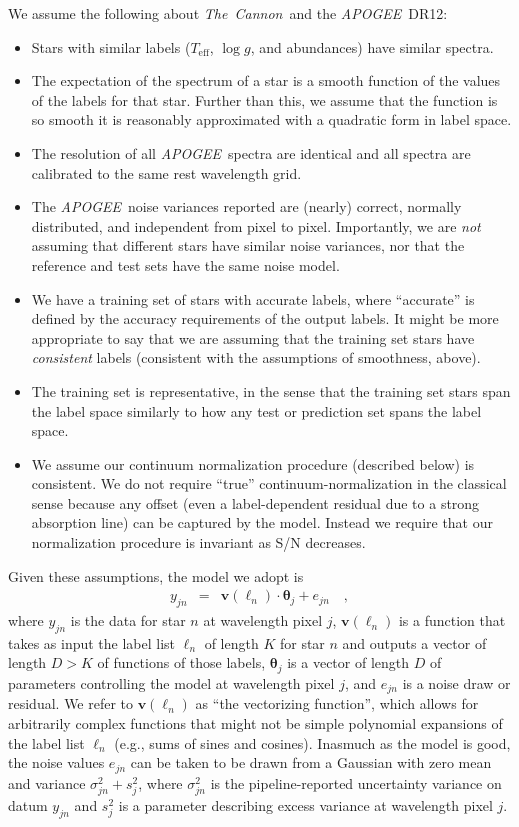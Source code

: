 \documentclass[12pt,preprint]{aastex}
\newcommand{\project}[1]{\textsl{#1}}
\newcommand{\TheCannon}{\project{The~Cannon}}
\newcommand{\acronym}[1]{{\small{#1}}}
\newcommand{\apogee}{\project{\acronym{APOGEE}}}
\newcommand{\dr}{\acronym{DR12}}
\newcommand{\logg}{\log g}
\newcommand{\Teff}{T_{\mathrm{eff}}}
\newcommand{\Dvector}[1]{\boldsymbol{#1}}
\newcommand{\vectheta}{\Dvector{\theta}}
\newcommand{\vecv}{\Dvector{v}}
\begin{document}
\noindent{}We assume the following about \TheCannon\ and the \apogee\ \dr:
\begin{itemize}
\item
Stars with similar labels ($\Teff$, $\logg$, and abundances) have similar spectra.
\item
The expectation of the spectrum of a star is a smooth function of the values of 
the labels for that star.  Further than this, we assume that the function is so 
smooth it is reasonably approximated with a quadratic form in label space.
\item
The resolution of all \apogee\ spectra are identical and all spectra are calibrated
to the same rest wavelength grid.
\item
The \apogee\ noise variances reported are (nearly) correct, normally distributed,
and independent from pixel to pixel.  
Importantly, we are \emph{not} assuming that different stars have similar noise
variances, nor that the reference and test sets have the same noise model.
\item
We have a training set of stars with accurate labels, where ``accurate'' is 
defined by the accuracy requirements of the output labels.  It might be more 
appropriate to say that we are assuming that the training set stars have 
\emph{consistent} labels (consistent with the assumptions of smoothness, above).

\item
The training set is representative, in the sense that the training set stars 
span the label space similarly to how any test or prediction set spans the label
space.
\item
We assume our continuum normalization procedure (described below) is consistent.
We do not require ``true'' continuum-normalization in the classical sense 
because any offset (even a label-dependent residual due to a strong absorption
line) can be captured by the model.  Instead we require that our normalization
procedure is invariant as S/N decreases.
\end{itemize}


\noindent{}Given these assumptions, the model we adopt is
\begin{eqnarray}
  y_{jn} &=& \vecv(\ell_n)\cdot\vectheta_j + e_{jn}
  \label{eq:model}\quad ,
\end{eqnarray}
where $y_{jn}$ is the data for star $n$ at wavelength pixel $j$, $\vecv(\ell_n)$
is a function that takes as input the label list $\ell_n$ of length $K$ for star
$n$ and outputs a vector of length $D>K$ of functions of those labels,
$\vectheta_j$ is a vector of length $D$ of parameters controlling the model at 
wavelength pixel $j$, and $e_{jn}$ is a noise draw or residual.  We refer to 
$\vecv(\ell_n)$ as ``the vectorizing function'', which allows for arbitrarily 
complex functions that might not be simple polynomial expansions of the label 
list $\ell_n$ (e.g., sums of sines and cosines).  Inasmuch as the model is good,
the noise values $e_{jn}$ can be taken to be drawn from a Gaussian with zero 
mean and variance $\sigma^2_{jn}+s^2_j$, where $\sigma^2_{jn}$ is the 
pipeline-reported uncertainty variance on datum $y_{jn}$ and $s^2_j$ is a 
parameter describing excess variance at wavelength pixel $j$.
\end{document}
